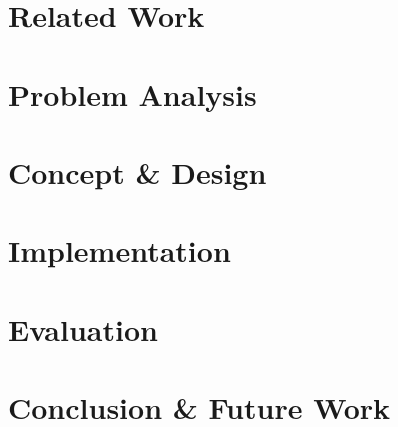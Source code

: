 \documentclass[12pt,a4paper,twoside]{report}
\theoremstyle{definition}
\begin{document}
\chapter{Related Work}
\label{ch:related_work}  	
	
\cleardoublepage    

\chapter{Problem Analysis}
\label{ch:problem_analysis}   
  		
  		
\chapter{Concept \& Design}
\label{ch:concept_design}  
	
\cleardoublepage    

\chapter{Implementation}
\label{ch:implementation}  

\cleardoublepage    

\chapter{Evaluation}
\label{ch:evaluation}  
	
\cleardoublepage  

\chapter{Conclusion \& Future Work}
\label{ch:conclusion_future_work}  
	
\cleardoublepage  

    
\nocite{*}


		
\cleardoublepage



\begin{appendices}
	
	\cleardoublepage
\end{appendices}

\listoftables
\cleardoublepage
\listoffigures
\cleardoublepage
\printindex
\cleardoublepage
\printnomenclature
\renewcommand{\leftmark}{\uppercase{Abbreviations}}
\cleardoublepage
\end{document}
